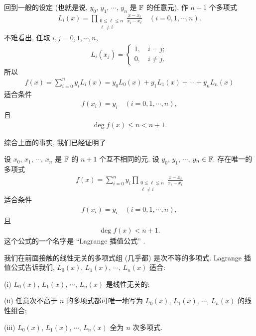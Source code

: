 回到一般的设定 (也就是说, $y_0$, $y_1$, $\cdots$, $y_n$ 是 $\mathbb{F}$ 的任意元). 作 $n+1$ 个多项式
\begin{align*}
    L_{i} (x) = \prod_{\begin{smallmatrix}0 \leq \ell \leq n \\\ell \neq i\end{smallmatrix}} \frac{x - x_\ell}{x_i - x_\ell} \quad (i = 0,1,\cdots,n).
\end{align*}
不难看出, 任取 $i,j = 0,1,\cdots,n$,
\begin{align*}
    L_{i} (x_j) = \begin{cases}
        1, \quad i = j; \\
        0, \quad i \neq j.
    \end{cases}
\end{align*}
所以
\begin{align*}
    f(x) = \sum_{i = 0}^{n} y_i L_{i} (x) = y_0 L_0 (x) + y_1 L_1 (x) + \cdots + y_n L_n (x)
\end{align*}
适合条件
\begin{align*}
    f(x_i) = y_i \quad (i = 0,1,\cdots,n),
\end{align*}
且
\begin{align*}
    \deg f(x) \leq n < n + 1.
\end{align*}

综合上面的事实, 我们已经证明了

\begin{proposition}
    设 $x_0$, $x_1$, $\cdots$, $x_{n}$ 是 $\mathbb{F}$ 的 $n+1$ 个互不相同的元. 设 $y_0$, $y_1$, $\cdots$, $y_{n} \in \mathbb{F}$. 存在唯一的多项式
    \begin{align*}
        f(x) = \sum_{i = 0}^{n} y_i \prod_{\begin{smallmatrix}0 \leq \ell \leq n \\\ell \neq i\end{smallmatrix}} \frac{x - x_\ell}{x_i - x_\ell}
    \end{align*}
    适合条件
    \begin{align*}
        f(x_i) = y_i \quad (i = 0,1,\cdots,n),
    \end{align*}
    且
    \begin{align*}
        \deg f(x) < n + 1.
    \end{align*}
    这个公式的一个名字是 ``Lagrange 插值公式'' .
\end{proposition}

\begin{remark}
    我们在前面接触的线性无关的多项式组 (几乎都) 是次不等的多项式. Lagrange 插值公式告诉我们, $L_0 (x)$, $L_1 (x)$, $\cdots$, $L_n (x)$ 适合:

    (i) $L_0 (x)$, $L_1 (x)$, $\cdots$, $L_n (x)$ 是线性无关的;

    (ii) 任意次不高于 $n$ 的多项式都可唯一地写为 $L_0 (x)$, $L_1 (x)$, $\cdots$, $L_n (x)$ 的线性组合;

    (iii) $L_0 (x)$, $L_1 (x)$, $\cdots$, $L_n (x)$ 全为 $n$ 次多项式.
\end{remark}

